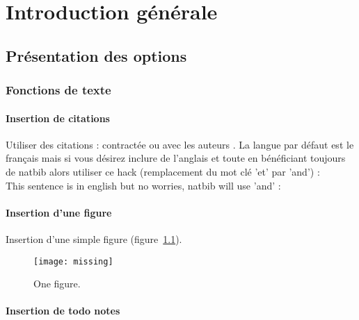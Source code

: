 
\chapter{Introduction générale}
\label{chap:introduction}

\myminitoc


\section{Présentation des options}

\subsection{Fonctions de texte}

\subsubsection{Insertion de citations}

Utiliser des citations : contractée \citep{small} ou avec les auteurs \citet{big}. 
La langue par défaut est le français mais si vous désirez inclure de l'anglais et
toute en bénéficiant toujours de natbib alors utiliser ce hack (remplacement du 
mot clé 'et' par 'and') : 
\\

\DeclareRobustCommand\authorand{and}
This sentence is in english but no worries, natbib will use 'and' : 
\citet{twoauthors}
\DeclareRobustCommand\authorand{et}


\subsubsection{Insertion d'une figure}

Insertion d'une simple figure (figure~\ref{fig:thelabel}).

\begin{figure}[!t]
  \centering
  \texttt{[image: missing]}
  \caption{\label{fig:thelabel} One figure.}
\end{figure} 


\subsubsection{Insertion de todo notes}

